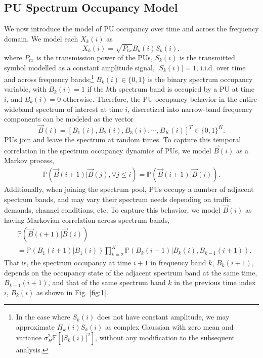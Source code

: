 \documentclass[10pt,twocolumn]{IEEEtran}
\begin{document}
\subsection{PU Spectrum Occupancy Model}
We now introduce the model of PU occupancy over time and across the frequency domain. We model each $X_k(i)$ as 
\begin{equation}\label{4}
    X_k(i) = \sqrt{P_{tx}}B_k(i)S_k(i),
\end{equation}
where $P_{tx}$ is the transmission power of the PUs, $S_k(i)$ is the transmitted symbol modelled as a constant amplitude signal, $|S_k(i)|{=}1$, i.i.d. over time and across frequency bands;\footnote{In the case where $S_k(i)$ does not have constant amplitude, we may approximate $H_{k}(i)S_{k}(i)$ as complex Gaussian with zero mean and variance $\sigma_H^2\mathbb E[|S_{k}(i)|^2]$, without any modification to the subsequent analysis.} $B_k(i){\in}\{0,1\}$ is the binary spectrum occupancy variable, with $B_k(i){=}1$ if the $k$th spectrum band is occupied by a PU at time $i$, and $B_k(i){=}0$ otherwise. Therefore, the PU occupancy behavior in the entire wideband spectrum of interest at time $i$, discretized into narrow-band frequency components can be modeled as the vector 
\begin{equation}\label{5}
    \vec{B}(i) = [B_1(i), B_2(i), B_3(i), \cdots, B_K(i)]^T {\in} \{0, 1\}^K.
\end{equation}
PUs join and leave the spectrum at random times. To capture this temporal correlation in the spectrum occupancy dynamics of PUs, we model $\vec{B}(i)$ as a Markov process,
\begin{equation}\label{6}
    \begin{aligned}
        \mathbb{P}(\vec{B}(i+1)|\vec{B}(j), \forall j \leq i) = \mathbb{P}(\vec{B}(i+1)|\vec{B}(i)).
    \end{aligned}
\end{equation}
Additionally, when joining the spectrum pool, PUs occupy a number of adjacent spectrum bands, and may vary their spectrum needs depending on traffic demands, channel conditions, etc. To capture this behavior, we model $\vec{B}(i)$ as having Markovian correlation across spectrum bands,
\begin{align}\label{7}
&         \mathbb{P}(\vec{B}(i+1)|\vec{B}(i))\\&=
\nonumber
         \mathbb{P}(B_{1}(i+1)|B_{1}(i))
         \prod_{k=2}^{K} \mathbb{P}(B_{k}(i+1)|B_{k}(i), B_{k-1}(i+1)).
\end{align}
That is, the spectrum occupancy at time $i+1$ in frequency band $k$, $B_{k}(i+1)$, depends on the  occupancy state of the adjacent spectrum band at the same time, $B_{k-1}(i+1)$, and that of the same spectrum band $k$ in the previous time index $i$, $B_{k}(i)$ as shown in Fig. \ref{fig:1}.
\vspace{-3mm}
\end{document}
